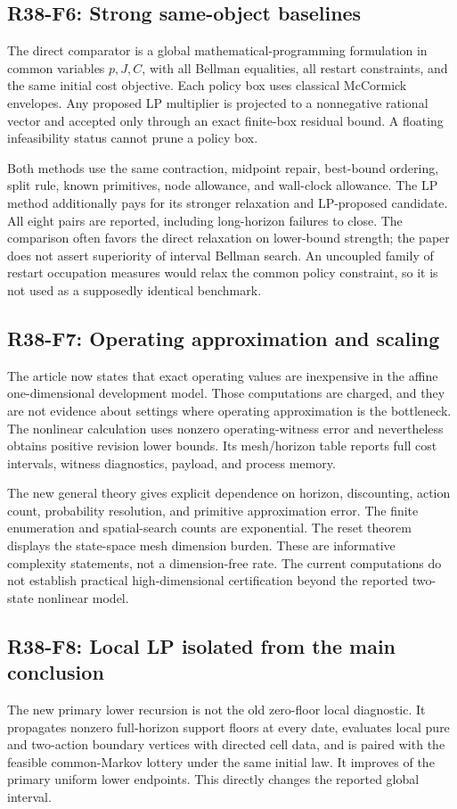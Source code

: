 \subsection{R38-F6: Strong same-object baselines}
The direct comparator is a global mathematical-programming formulation in common variables $p,J,C$, with all Bellman equalities, all restart constraints, and the same initial cost objective. Each policy box uses classical McCormick envelopes. Any proposed LP multiplier is projected to a nonnegative rational vector and accepted only through an exact finite-box residual bound. A floating infeasibility status cannot prune a policy box.

Both methods use the same contraction, midpoint repair, best-bound ordering, split rule, known primitives, node allowance, and wall-clock allowance. The LP method additionally pays for its stronger relaxation and LP-proposed candidate. All eight pairs are reported, including long-horizon failures to close. The comparison often favors the direct relaxation on lower-bound strength; the paper does not assert superiority of interval Bellman search. An uncoupled family of restart occupation measures would relax the common policy constraint, so it is not used as a supposedly identical benchmark.

\subsection{R38-F7: Operating approximation and scaling}
The article now states that exact operating values are inexpensive in the affine one-dimensional development model. Those computations are charged, and they are not evidence about settings where operating approximation is the bottleneck. The nonlinear calculation uses nonzero operating-witness error and nevertheless obtains positive revision lower bounds. Its mesh/horizon table reports full cost intervals, witness diagnostics, payload, and process memory.

The new general theory gives explicit dependence on horizon, discounting, action count, probability resolution, and primitive approximation error. The finite enumeration and spatial-search counts are exponential. The reset theorem displays the state-space mesh dimension burden. These are informative complexity statements, not a dimension-free rate. The current computations do not establish practical high-dimensional certification beyond the reported two-state nonlinear model.

\subsection{R38-F8: Local LP isolated from the main conclusion}
The new primary lower recursion is not the old zero-floor local diagnostic. It propagates nonzero full-horizon support floors at every date, evaluates local pure and two-action boundary vertices with directed cell data, and is paired with the feasible common-Markov lottery under the same initial law. It improves \LocalImproveCount{} of the primary uniform lower endpoints. This directly changes the reported global interval.

